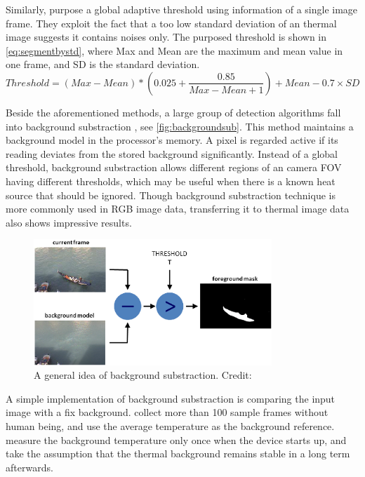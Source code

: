 Similarly, \citeauthor{jeong2014probabilistic} \cite{jeong2014probabilistic} purpose a global adaptive threshold using information of a single image frame. They exploit the fact that a too low standard deviation of an thermal image suggests it contains noises only. The purposed threshold is shown in \autoref{eq:segmentbystd}, where Max and Mean are the maximum and mean value in one frame, and SD is the standard deviation.
\begin{equation}\label{eq:segmentbystd}
  Threshold = (Max-Mean)*\left(0.025+\frac{0.85}{Max-Mean+1}\right) + Mean - 0.7\times SD
\end{equation}

Beside the aforementioned methods, a large group of detection algorithms fall into background substraction \cite{backgroundsubsurvey}, see \autoref{fig:backgroundsub}. This method maintains a background model in the processor's memory. A pixel is regarded active if its reading deviates from the stored background significantly. Instead of a global threshold, background substraction allows different regions of an camera FOV having different thresholds, which may be useful when there is a known heat source that should be ignored. Though background substraction technique is more commonly used in RGB image data, transferring it to thermal image data also shows impressive results.
\begin{figure}
  \centering
  \includegraphics[width=0.8\textwidth]{figures/Background_Subtraction.png}
  \caption{A general idea of background substraction. Credit: \cite{opencvBackgroundSub}}\label{fig:backgroundsub}
\end{figure}

A simple implementation of background substraction is comparing the input image with a fix background. \citeauthor{basu2015tracking} \cite{basu2015tracking} collect more than 100 sample frames without human being, and use the average temperature as the background reference. \citeauthor{firstflow} \cite{firstflow} measure the background temperature only once when the device starts up, and take the assumption that the thermal background remains stable in a long term afterwards.

